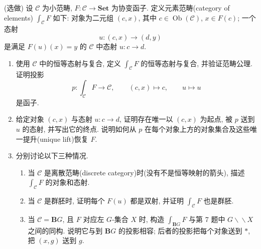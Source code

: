 \documentclass{article}
\begin{document}
\begin{problem}
  (选做) 设 $\mathcal C$ 为小范畴, $F:\mathcal C\to\mathbf{Set}$ 为协变函子. 定义元素范畴(category of elements) $\int_{\mathcal C}F$ 如下: 对象为二元组 $(c,x)$, 其中 $c\in\operatorname{Ob}(\mathcal C)$, $x\in F(c)$; 一个态射
  \[
    u:(c,x)\longrightarrow(d,y)
  \]
  是满足 $F(u)(x)=y$ 的 $\mathcal C$ 中态射 $u:c\to d$.
  \begin{enumerate}
    \item[(a)] 使用 $\mathcal C$ 中的恒等态射与复合, 定义 $\int_{\mathcal C}F$ 的恒等态射与复合, 并验证范畴公理. 证明投影
      \[
        p:\int_{\mathcal C}F\longrightarrow\mathcal C,\qquad
        (c,x)\longmapsto c,\qquad u\longmapsto u
      \]
      是函子.
    \item[(b)] 给定对象 $(c,x)$ 与态射 $u:c\to d$, 证明存在唯一以 $(c,x)$ 为起点, 被 $p$ 送到 $u$ 的态射, 并写出它的终点. 说明如何从 $p$ 在每个对象上方的对象集合及这些唯一提升(unique lift)恢复 $F$.
    \item[(c)] 分别讨论以下三种情况.
      \begin{enumerate}
        \item[(i)] 当 $\mathcal C$ 是离散范畴(discrete category)时(没有不是恒等映射的箭头), 描述 $\int_{\mathcal C}F$ 的对象和态射.
        \item[(ii)] 当 $\mathcal C$ 是群胚时, 证明每个 $F(u)$ 都是双射, 并证明 $\int_{\mathcal C}F$ 也是群胚.
        \item[(iii)] 当 $\mathcal C=\mathbf{B}G$, 且 $F$ 对应左 $G$-集合 $X$ 时, 构造 $\int_{\mathbf{B}G}F$ 与第 7 题中 $G\backslash\!\backslash X$ 之间的同构. 说明它与到 $\mathbf{B}G$ 的投影相容; 后者的投影把每个对象送到 $*$, 把 $(x,g)$ 送到 $g$.
      \end{enumerate}
  \end{enumerate}
\end{problem}
\end{document}

